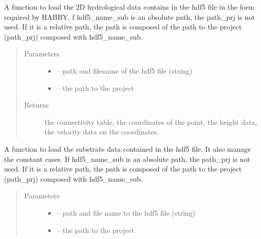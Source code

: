 \documentclass[letterpaper,10pt,english]{sphinxmanual}
\begin{document}
\begin{fulllineitems}
\label{\detokenize{index:src.load_hdf5.load_hdf5_hyd}}
A function to load the 2D hydrological data contains in the hdf5 file in the form required by HABBY. f hdf5\_name\_sub
is an absolute path, the path\_prj is not used. If it is a relative path, the path is composed of the path to the
project (path\_prj) composed with hdf5\_name\_sub.
\begin{quote}\begin{description}
\item[{Parameters}] \leavevmode\begin{itemize}
\item {} 
 -- path and filename of the hdf5 file (string)

\item {} 
 -- the path to the project

\end{itemize}

\item[{Returns}] \leavevmode
the connectivity table, the coordinates of the point, the height data, the velocity data on the coordinates.

\end{description}\end{quote}

\end{fulllineitems}


\begin{fulllineitems}
\label{\detokenize{index:src.load_hdf5.load_hdf5_sub}}
A function to load the substrate data contained in the hdf5 file. It also manage
the constant cases. If hdf5\_name\_sub is an absolute path, the path\_prj is not used. If it is a relative path,
the path is composed of the path to the project (path\_prj) composed with hdf5\_name\_sub.
\begin{quote}\begin{description}
\item[{Parameters}] \leavevmode\begin{itemize}
\item {} 
 -- path and file name to the hdf5 file (string)

\item {} 
 -- the path to the project

\end{itemize}

\end{description}\end{quote}

\end{fulllineitems}
\end{document}
